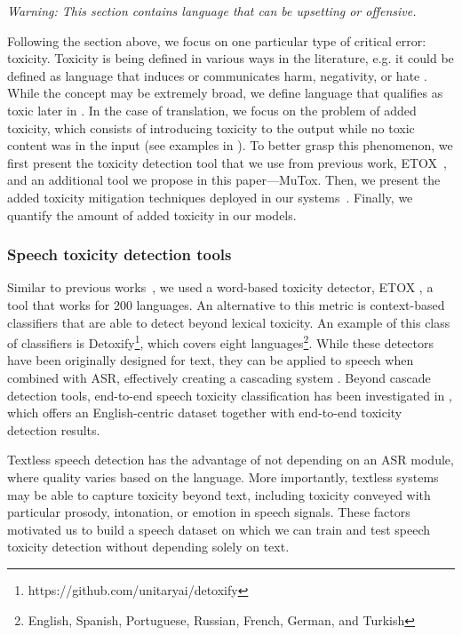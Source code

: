 \textit{Warning: This section contains language that can be upsetting or offensive.}

Following the section above, we focus on one particular type of critical error: toxicity. Toxicity is being defined in various ways in the literature, e.g. it could be defined as language that induces or communicates harm, negativity, or hate \citep{gehman-etal-2020-realtoxicityprompts,costajussa2023toxicity}. While the concept may be extremely broad, we define language that qualifies as toxic later in . In the case of translation, we focus on the problem of added toxicity, which consists of introducing toxicity to the output while no toxic content was in the input (see examples in ). To better grasp this phenomenon, we first present the toxicity detection tool that we use from previous work, ETOX~\citep{SeamlessM4TArXiv}, and an additional tool we propose in this paper—MuTox. Then, we present the added toxicity mitigation techniques deployed in our systems~\citep{mintox}. Finally, we quantify the amount of added toxicity in our models.

\subsubsection{Speech toxicity detection tools}
\label{sec:toxicity:detection}

Similar to previous works~\citep{nllb2022,SeamlessM4TArXiv}, we used a word-based toxicity detector, ETOX \citep{costajussa2023toxicity}, a tool that works for 200 languages. An alternative to this metric is context-based classifiers that are able to detect beyond lexical toxicity. An example of this class of classifiers is Detoxify\footnote{https://github.com/unitaryai/detoxify}, which covers eight languages\footnote{English, Spanish, Portuguese, Russian, French, German, and Turkish}. While these detectors have been originally designed for text, they can be applied to speech when combined with ASR, effectively creating a cascading system \citep{SeamlessM4TArXiv}. Beyond cascade detection tools, end-to-end speech toxicity classification has been investigated in \citet{Ghosh2021DeToxyAL}, which offers an English-centric dataset together with end-to-end toxicity detection results. 

Textless speech detection has the advantage of not depending on an ASR module, where quality varies based on the language. More importantly, textless systems may be able to capture toxicity beyond text, including toxicity conveyed with particular prosody, intonation, or emotion in speech signals. These factors motivated us to build a speech dataset on which we can train and test speech toxicity detection without depending solely on text.

